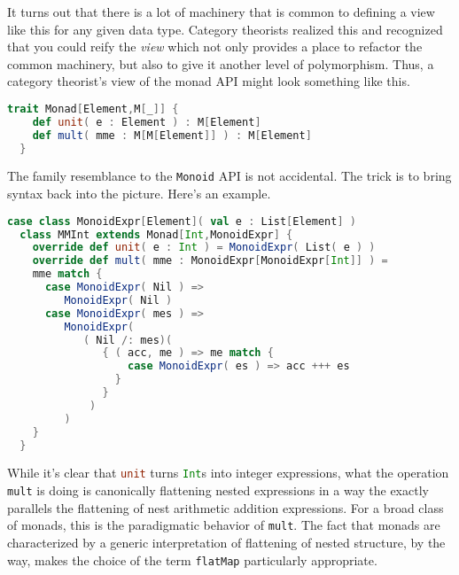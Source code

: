It turns out that there is a lot of machinery that is common to
defining a view like this for any given data type. Category theorists
realized this and recognized that you could reify the \emph{view}
which not only provides a place to refactor the common machinery, but
also to give it another level of polymorphism. Thus, a category
theorist's view of the monad API might look something like this.

\begin{lstlisting}[language=Scala]
  trait Monad[Element,M[_]] {
    def unit( e : Element ) : M[Element]
    def mult( mme : M[M[Element]] ) : M[Element] 
  }
\end{lstlisting}

The family resemblance to the \lstinline[language=Scala]!Monoid! API
is not accidental. The trick is to bring syntax back into the picture. Here's an example.

\begin{lstlisting}[language=Scala]
  case class MonoidExpr[Element]( val e : List[Element] )
  class MMInt extends Monad[Int,MonoidExpr] {
    override def unit( e : Int ) = MonoidExpr( List( e ) )
    override def mult( mme : MonoidExpr[MonoidExpr[Int]] ) =
    mme match {
      case MonoidExpr( Nil ) =>
         MonoidExpr( Nil )
      case MonoidExpr( mes ) => 
         MonoidExpr(
            ( Nil /: mes)( 
               { ( acc, me ) => me match { 
                   case MonoidExpr( es ) => acc +++ es 
                 } 
               } 
             )
         )
    }
  }
\end{lstlisting}

While it's clear that \lstinline[language=Scala]!unit! turns
\lstinline[language=Scala]!Int!s into integer expressions, what the
operation \lstinline[language=Scala]!mult! is doing is canonically
flattening nested expressions in a way the exactly parallels the
flattening of nest arithmetic addition expressions. For a broad class
of monads, this is the paradigmatic behavior of
\lstinline[language=Scala]!mult!. The fact that monads are
characterized by a generic interpretation of flattening of nested
structure, by the way, makes the choice of the term
\lstinline[language=Scala]!flatMap! particularly appropriate.

